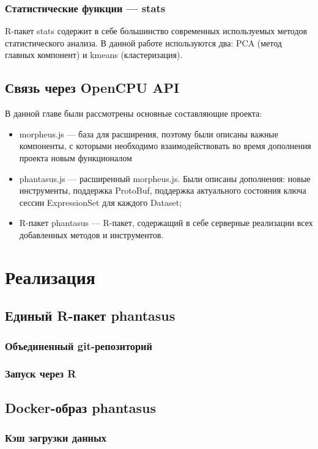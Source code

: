 \documentclass[specification,annotation]{itmo-student-thesis}
\begin{document}
\subsection{Статистические функции --- stats}
R-пакет stats \cite{stats} содержит в себе большинство современных используемых методов статистического анализа.
В данной работе используются два: PCA (метод главных компонент) и kmeans (кластеризация).

\section{Связь через OpenCPU API}
\chapterconclusion
В данной главе были рассмотрены основные составляющие проекта:
\begin{itemize}
\item morpheus.js --- база для расширения, поэтому были описаны важные компоненты, с которыми необходимо взаимодействовать во время дополнения проекта новым функционалом
\item phantasus.js --- расширенный morpheus.js. Были описаны дополнения: новые инструменты, поддержка ProtoBuf, поддержка актуального состояния ключа сессии ExpressionSet для каждого Dataset;
\item R-пакет phantasus --- R-пакет, содержащий в себе серверные реализации всех добавленных методов и инструментов.
\end{itemize}

\chapter{Реализация}
\section{Единый R-пакет phantasus}
\subsection{Объединенный git-репозиторий}
\subsection{Запуск через R}

\section{Docker-образ phantasus}
\subsection{Кэш загрузки данных}
\end{document}
